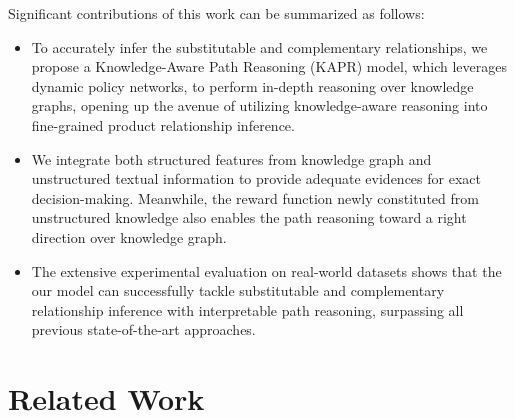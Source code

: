 \documentclass[review]{elsarticle}
\begin{document}
\begin{sloppypar}
Significant contributions of this work can be summarized as follows:
\begin{itemize}
  \item[1.]  To accurately infer the substitutable and complementary relationships, we propose a Knowledge-Aware Path Reasoning (KAPR) model, which leverages dynamic policy networks, to perform in-depth reasoning over knowledge graphs, opening up the avenue of utilizing knowledge-aware reasoning into fine-grained product relationship inference. 
  \item[2.] We integrate both structured features from knowledge graph and unstructured textual information to provide adequate evidences for exact decision-making. Meanwhile, the reward function newly constituted from unstructured knowledge also enables the path reasoning toward a right direction over knowledge graph. 
  \item[3.]  The extensive experimental evaluation on real-world datasets shows that the our model can successfully tackle substitutable and complementary relationship inference with interpretable path reasoning, surpassing all previous state-of-the-art approaches.
\end{itemize}
\section{Related Work}

\end{sloppypar}
\end{document}

